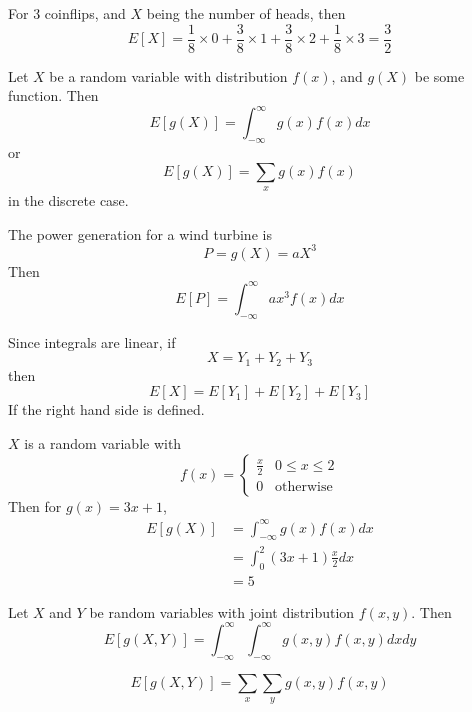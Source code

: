 \documentclass[12pt]{article}
\begin{document}
\begin{ex}
	For 3 coinflips, and $X$ being the number of heads, then
	$$E[X] = \frac{1}{8}\times0 + \frac{3}{8}\times1 + \frac{3}{8}\times2 + \frac{1}{8}\times3 = \frac{3}{2}$$
\end{ex}

Let $X$ be a random variable with distribution $f(x)$, and $g(X)$ be some function. Then
$$E[g(X)] = \int_{-\infty}^\infty g(x)f(x)dx$$
or
$$E[g(X)] = \sum_x g(x)f(x)$$
in the discrete case.

\begin{ex}
	The power generation for a wind turbine is
	$$P=g(X)=aX^3$$
	Then
	$$E[P] = \int_{-\infty}^\infty ax^3f(x)dx$$
\end{ex}

Since integrals are linear, if
$$X=Y_1+Y_2+Y_3$$
then
$$E[X] = E[Y_1] + E[Y_2] + E[Y_3]$$
If the right hand side is defined.

\begin{ex}
	$X$ is a random variable with
	$$f(x) = \begin{cases} \frac{x}{2} & 0\leq x\leq 2 \\ 0 & \text{otherwise}\end{cases}$$
	Then for $g(x)=3x+1$,
	\begin{align*}
		E[g(X)] &= \int_{-\infty}^\infty g(x)f(x)dx \\
			&= \int_0^2 (3x+1)\frac{x}{2}dx \\
			&= 5
	\end{align*}
\end{ex}

Let $X$ and $Y$ be random variables with joint distribution $f(x,y)$. Then
$$E[g(X,Y)] = \int_{-\infty}^\infty\int_{-\infty}^\infty g(x,y)f(x,y)dxdy$$

$$E[g(X,Y)] = \sum_x\sum_yg(x,y)f(x,y)$$
\end{document}
